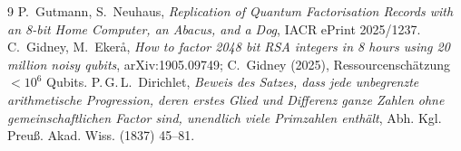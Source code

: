 \begin{thebibliography}{9}
 P.~Gutmann, S.~Neuhaus, \textit{Replication of Quantum Factorisation Records with an 8-bit Home Computer, an Abacus, and a Dog}, IACR ePrint 2025/1237.
 C.~Gidney, M.~Ekerå, \textit{How to factor 2048 bit RSA integers in 8 hours using 20 million noisy qubits}, arXiv:1905.09749; C.~Gidney (2025), Ressourcenschätzung $<10^6$ Qubits.
 P.\,G.\,L.~Dirichlet, \textit{Beweis des Satzes, dass jede unbegrenzte arithmetische Progression, deren erstes Glied und Differenz ganze Zahlen ohne gemeinschaftlichen Factor sind, unendlich viele Primzahlen enthält}, Abh. Kgl. Preuß. Akad. Wiss. (1837) 45--81.
\end{thebibliography}

